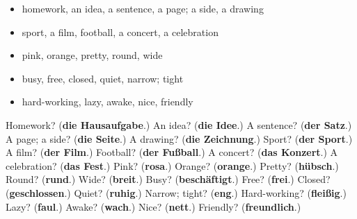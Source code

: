 \begin{itemize}
\raggedright
  \item homework, an idea, a sentence, a page; a side, a drawing
  \item sport, a film, football, a concert, a celebration
  \item pink, orange, pretty, round, wide
  \item busy, free, closed, quiet, narrow; tight
  \item hard-working, lazy, awake, nice, friendly
\end{itemize}

\begin{tcolorbox}[breakable,colback=teal!4,colframe=teal!35!black,title={Before you move on}]
Homework? (\textbf{die Hausaufgabe}.) An idea? (\textbf{die Idee}.) A sentence? (\textbf{der Satz}.) A page; a side? (\textbf{die Seite}.) A drawing? (\textbf{die Zeichnung}.) Sport? (\textbf{der Sport}.) A film? (\textbf{der Film}.) Football? (\textbf{der Fußball}.) A concert? (\textbf{das Konzert}.) A celebration? (\textbf{das Fest}.) Pink? (\textbf{rosa}.) Orange? (\textbf{orange}.) Pretty? (\textbf{hübsch}.) Round? (\textbf{rund}.) Wide? (\textbf{breit}.) Busy? (\textbf{beschäftigt}.) Free? (\textbf{frei}.) Closed? (\textbf{geschlossen}.) Quiet? (\textbf{ruhig}.) Narrow; tight? (\textbf{eng}.) Hard-working? (\textbf{fleißig}.) Lazy? (\textbf{faul}.) Awake? (\textbf{wach}.) Nice? (\textbf{nett}.) Friendly? (\textbf{freundlich}.)
\end{tcolorbox}
